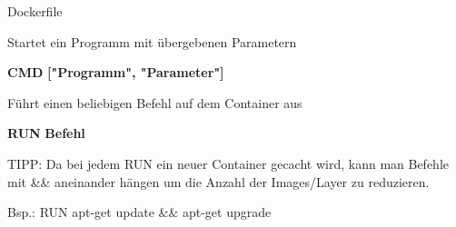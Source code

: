 \documentclass[final]{beamer}
\newlength{\onecolwid}
\begin{document}
\begin{frame}
\begin{columns}[t]
\begin{column}{\onecolwid}
\begin{block}{Dockerfile}
\vspace{1cm}
\par Startet ein Programm mit übergebenen Parametern
\par \textcolor{docker-pu}{\textbf{CMD}} \textcolor{docker-red}{\textbf{["Programm", "Parameter"]}}

\vspace{1cm}
\par Führt einen beliebigen Befehl auf dem Container aus
\par \textcolor{docker-pu}{\textbf{RUN}} \textcolor{docker-red}{\textbf{Befehl}}

\begin{small}
\vspace{1cm}
\par TIPP: Da bei jedem RUN ein neuer Container gecacht wird, kann man Befehle mit \&\& aneinander hängen um die Anzahl der Images/Layer zu reduzieren.

\vspace{1cm}
\par Bsp.: RUN apt-get update \&\& apt-get upgrade
	
\end{small}



\vspace{3cm}


\end{block}
\end{column}
\end{columns}
\end{frame}
\end{document}

